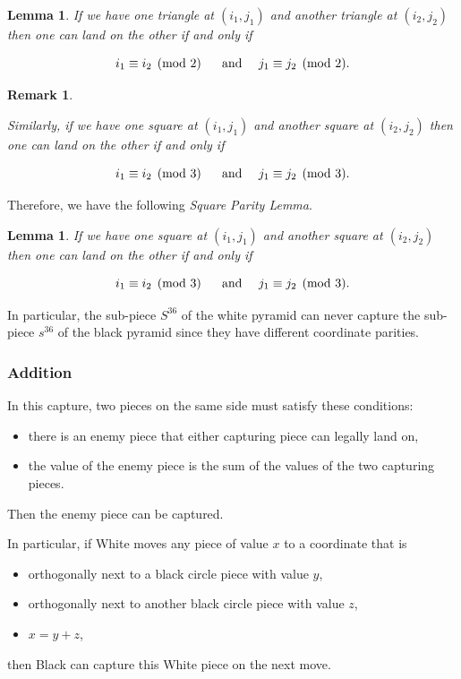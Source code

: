 \documentclass[12pt]{article}
\newtheorem{lemma}[theorem]{Lemma}
\newtheorem{remark}{Remark}
\begin{document}
\begin{lemma}
\label{lemma:TPL}  
If we have one triangle at $(i_1,j_1)$
and another triangle at $(i_2,j_2)$ then one can land on
the other if and only if

\[
i_1\equiv i_2\pmod{2}\ \ \ \ \ {\rm and}\ \ \ \ j_1\equiv j_2\pmod{2}.
\]
\end{lemma}

\begin{remark}
\label{rmk:parity3}
{\rm
Similarly, if we have one square at $(i_1,j_1)$
and another square at $(i_2,j_2)$ then one can land on
the other if and only if

\[
i_1\equiv i_2\pmod{3}\ \ \ \ \ {\rm and}\ \ \ \ j_1\equiv j_2\pmod{3}.
\]
}
\end{remark}

Therefore, we have the following {\it Square Parity Lemma}.

\begin{lemma}
\label{lemma:SPL}  
If we have one square at $(i_1,j_1)$
and another square at $(i_2,j_2)$ then one can land on
the other if and only if

\[
i_1\equiv i_2\pmod{3}\ \ \ \ \ {\rm and}\ \ \ \ j_1\equiv j_2\pmod{3}.
\]
\end{lemma}
In particular, the sub-piece $S^{36}$ of the white pyramid
can never capture the sub-piece $s^{36}$ of the black pyramid
since they have different coordinate parities.


\subsubsection{Addition}

In this capture, two pieces on the same side must satisfy
these conditions:
\begin{itemize}
\item
there is an enemy piece that either capturing piece can legally land on,
\item
the value of the enemy piece is the sum of the values of the two
capturing pieces.
\end{itemize}
Then the enemy piece can be captured.

In particular, if White moves any piece of value $x$
to a coordinate that is 
\begin{itemize}
\item[(a)] orthogonally next to a black circle piece with value $y$,
\item[(b)] orthogonally next to another black circle piece with value $z$,
\item[(c)] $x=y+z$, 
\end{itemize}
then Black can capture this White piece on the next move.
\end{document}
